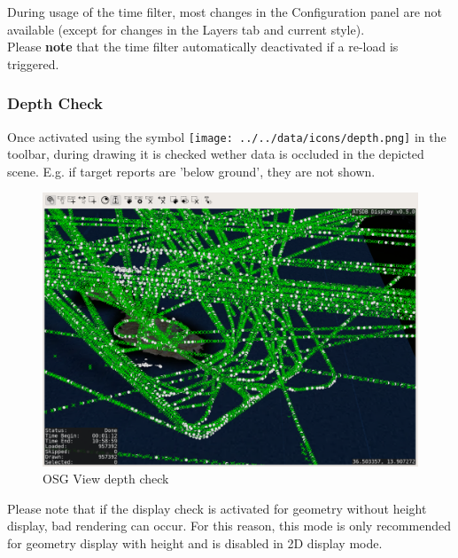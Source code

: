 During usage of the time filter, most changes in the Configuration panel are not available (except for changes in the Layers tab and current style). \\

Please \textbf{note} that the time filter automatically deactivated if a re-load is triggered.

\subsubsection{Depth Check}

Once activated using the symbol \texttt{[image: ../../data/icons/depth.png]} in the toolbar, during drawing it is checked wether data is occluded in the depicted scene. E.g. if target reports are 'below ground', they are not shown.

\begin{figure}[H]
    \hspace*{-2cm}
    \includegraphics[width=18cm,frame]{figures/osgview_depth_check.png}
  \caption{OSG View depth check}
\end{figure}

Please note that if the display check is activated for geometry without height display, bad rendering can occur. For this reason, this mode is only recommended for geometry display with height and is disabled in 2D display mode.

